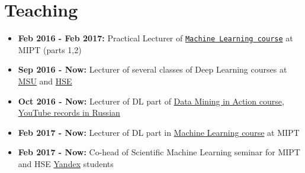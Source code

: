 \documentclass[a4paper,10pt]{article} %
\begin{document}
\section{Teaching}
\begin{itemize}
	\item \textbf{Feb 2016 - Feb 2017:} Practical Lecturer of  \href{https://ml-mipt.github.io/}{\texttt{Machine Learning course}} at  MIPT (parts 1,2)
	\item \textbf{Sep 2016 - Now:} Lecturer of several classes of Deep Learning courses at \href{https://goo.gl/3wXB4f}{MSU} and \href{https://github.com/yandexdataschool/HSE_deeplearning}{HSE}
	\item  \textbf{Oct 2016 - Now:}  Lecturer of DL part of \href{https://vk.com/data_mining_in_action}{Data Mining in Action course}, \href{https://www.youtube.com/channel/UCop3CelRVvrchG5lsPyxvHg}{YouTube records  in Russian \frownie}
	\item  \textbf{Feb 2017 - Now:}  Lecturer of DL part in \href{https://ml-mipt.github.io/}{Machine Learning course} at MIPT
	\item  \textbf{Feb 2017 - Now:}  Co-head of Scientific Machine Learning seminar for MIPT and HSE \href{https://yandexdataschool.com/}{Yandex} students
\end{itemize}
\end{document}
